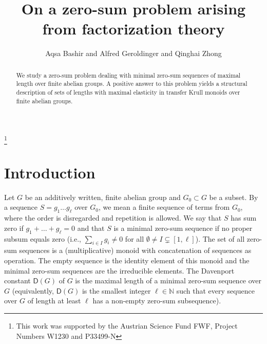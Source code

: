 \documentclass[a4paper,10pt]{amsart}
\theoremstyle{plain}
\theoremstyle{definition}
\newcommand{\N}{\mathbb N}
\numberwithin{equation}{section}
\begin{document}
\title{On a zero-sum problem arising from factorization theory}

\address{Institut f\"ur Mathematik und wissenschaftliches Rechnen, Karl-Franzens-Universit\"at Graz, NAWI Graz, Heinrichstra{\ss}e 36, 8010 Graz, Austria}
\author{Aqsa Bashir and Alfred Geroldinger and Qinghai Zhong}

\thanks{This work was supported by the Austrian Science Fund FWF, Project Numbers  W1230 and P33499-N}

\begin{abstract}
We study a zero-sum problem dealing with minimal zero-sum sequences of maximal length over finite abelian groups. A positive answer to this problem yields a structural description of sets of lengths with maximal elasticity in transfer Krull monoids over finite abelian groups.
\end{abstract}

\maketitle

\section{Introduction}\label{1}

Let $G$ be an additively written, finite abelian group and $G_0 \subset G$ be a subset. By a sequence $S = g_1 \ldots g_{\ell}$ over $G_0$, we mean a finite sequence of terms from $G_0$, where the order is disregarded and repetition is allowed. We say that $S$ has sum zero if $g_1 + \ldots + g_{\ell}=0$ and that $S$ is a minimal zero-sum sequence if no proper subsum equals zero (i.e., $\sum_{i \in I} g_i \ne 0$ for all $\emptyset \ne I \subsetneq [1, \ell]$). The set of all zero-sum sequences is a (multiplicative) monoid with concatenation of sequences as operation. The empty sequence is the identity element of this monoid and the minimal zero-sum sequences are the irreducible elements.
The Davenport constant $\mathsf D (G)$ of $G$ is the maximal length of a minimal zero-sum sequence over $G$ (equivalently, $\mathsf D (G)$ is the smallest integer $\ell \in \N$ such that every sequence over $G$ of length at least $\ell$ has  a non-empty zero-sum subsequence).
\end{document}
